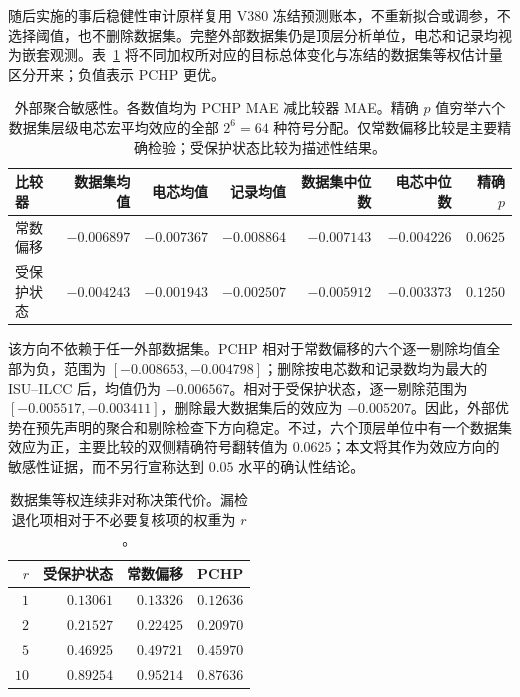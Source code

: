 \documentclass[UTF8,11pt]{ctexart}
\begin{document}
随后实施的事后稳健性审计原样复用 V380 冻结预测账本，不重新拟合或调参，不选择阈值，也不删除数据集。完整外部数据集仍是顶层分析单位，电芯和记录均视为嵌套观测。表~\ref{tab:external_robustness_zh} 将不同加权所对应的目标总体变化与冻结的数据集等权估计量区分开来；负值表示 PCHP 更优。

\begin{table}[H]
\centering
\caption{外部聚合敏感性。各数值均为 PCHP MAE 减比较器 MAE。精确 $p$ 值穷举六个数据集层级电芯宏平均效应的全部 $2^6=64$ 种符号分配。仅常数偏移比较是主要精确检验；受保护状态比较为描述性结果。}
\label{tab:external_robustness_zh}
\scriptsize
\begin{tabular}{lrrrrrr}
\toprule
比较器 & 数据集均值 & 电芯均值 & 记录均值 & 数据集中位数 & 电芯中位数 & 精确 $p$ \\
\midrule
常数偏移 & $-0.006897$ & $-0.007367$ & $-0.008864$ & $-0.007143$ & $-0.004226$ & $0.0625$ \\
受保护状态 & $-0.004243$ & $-0.001943$ & $-0.002507$ & $-0.005912$ & $-0.003373$ & $0.1250$ \\
\bottomrule
\end{tabular}
\end{table}

该方向不依赖于任一外部数据集。PCHP 相对于常数偏移的六个逐一剔除均值全部为负，范围为 $[-0.008653,-0.004798]$；删除按电芯数和记录数均为最大的 ISU--ILCC 后，均值仍为 $-0.006567$。相对于受保护状态，逐一剔除范围为 $[-0.005517,-0.003411]$，删除最大数据集后的效应为 $-0.005207$。因此，外部优势在预先声明的聚合和剔除检查下方向稳定。不过，六个顶层单位中有一个数据集效应为正，主要比较的双侧精确符号翻转值为 $0.0625$；本文将其作为效应方向的敏感性证据，而不另行宣称达到 $0.05$ 水平的确认性结论。

\begin{table}[H]
\centering
\caption{数据集等权连续非对称决策代价。漏检退化项相对于不必要复核项的权重为 $r$。}
\label{tab:external_decision_cost_zh}
\begin{tabular}{rrrr}
\toprule
$r$ & 受保护状态 & 常数偏移 & PCHP \\
\midrule
$1$  & $0.13061$ & $0.13326$ & $0.12636$ \\
$2$  & $0.21527$ & $0.22425$ & $0.20970$ \\
$5$  & $0.46925$ & $0.49721$ & $0.45970$ \\
$10$ & $0.89254$ & $0.95214$ & $0.87636$ \\
\bottomrule
\end{tabular}
\end{table}
\end{document}
